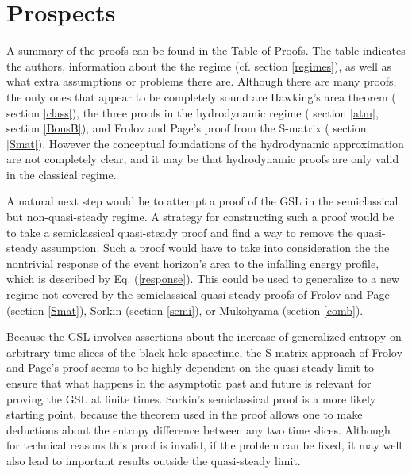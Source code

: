 \documentclass{article}
\begin{document}
\section{Prospects}

A summary of the proofs can be found in the Table of Proofs.  The table indicates the authors, information about the the regime (cf. section \ref{regimes}), as well as what extra assumptions or problems there are.  Although there are many proofs, the only ones that appear to be completely sound are Hawking's area theorem (\cite{hawking71} section \ref{class}), the three proofs in the hydrodynamic regime (\cite{wald94} section \ref{atm}, \cite{FMW00}\cite{BFM03} section \ref{BousB}), and Frolov and Page's proof from the S-matrix (\cite{FP93} section \ref{Smat}).  However the conceptual foundations of the hydrodynamic approximation are not completely clear, and it may be that hydrodynamic proofs are only valid in the classical regime.

A natural next step would be to attempt a proof of the GSL in the semiclassical but non-quasi-steady regime.  A strategy for constructing such a proof would be to take a semiclassical quasi-steady proof and find a way to remove the quasi-steady assumption.  Such a proof would have to take into consideration the the nontrivial response of the event horizon's area to the infalling energy profile, which is described by Eq. (\ref{response}).  This could be used to generalize to a new regime not covered by the semiclassical quasi-steady proofs of Frolov and Page \cite{FP93} (section \ref{Smat}), Sorkin \cite{sorkin98} (section \ref{semi}), or Mukohyama \cite{muko97} (section \ref{comb}).

Because the GSL involves assertions about the increase of generalized entropy on arbitrary time slices of the black hole spacetime, the S-matrix approach of Frolov and Page's proof seems to be highly dependent on the quasi-steady limit to ensure that what happens in the asymptotic past and future is relevant for proving the GSL at finite times.  Sorkin's semiclassical proof is a more likely starting point, because the theorem used in the proof allows one to make deductions about the entropy difference between any two time slices.  Although for technical reasons this proof is invalid, if the problem can be fixed, it may well also lead to important results outside the quasi-steady limit.
\end{document}
